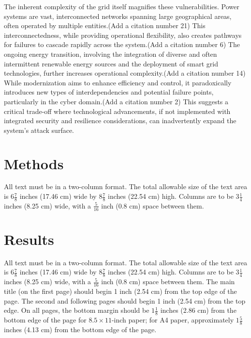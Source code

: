 \documentclass[10pt,twocolumn,letterpaper]{article}
\begin{document}
The inherent complexity of the grid itself magnifies these vulnerabilities. Power systems are vast, interconnected networks spanning large geographical areas, often operated by multiple entities.(Add a citation number 21) This interconnectedness, while providing operational flexibility, also creates pathways for failures to cascade rapidly across the system.(Add a citation number 6) The ongoing energy transition, involving the integration of diverse and often intermittent renewable energy sources and the deployment of smart grid technologies, further increases operational complexity.(Add a citation number 14) While modernization aims to enhance efficiency and control, it paradoxically introduces new types of interdependencies and potential failure points, particularly in the cyber domain.(Add a citation number 2) This suggests a critical trade-off where technological advancements, if not implemented with integrated security and resilience considerations, can inadvertently expand the system's attack surface.


\section{Methods}
\label{sec:methods}

All text must be in a two-column format.
The total allowable size of the text area is $6\frac78$ inches (17.46 cm) wide by $8\frac78$ inches (22.54 cm) high.
Columns are to be $3\frac14$ inches (8.25 cm) wide, with a $\frac{5}{16}$ inch (0.8 cm) space between them.



\section{Results}
\label{sec:results}

All text must be in a two-column format.
The total allowable size of the text area is $6\frac78$ inches (17.46 cm) wide by $8\frac78$ inches (22.54 cm) high.
Columns are to be $3\frac14$ inches (8.25 cm) wide, with a $\frac{5}{16}$ inch (0.8 cm) space between them.
The main title (on the first page) should begin 1 inch (2.54 cm) from the top edge of the page.
The second and following pages should begin 1 inch (2.54 cm) from the top edge.
On all pages, the bottom margin should be $1\frac{1}{8}$ inches (2.86 cm) from the bottom edge of the page for $8.5 \times 11$-inch paper;
for A4 paper, approximately $1\frac{5}{8}$ inches (4.13 cm) from the bottom edge of the
page.
\end{document}
